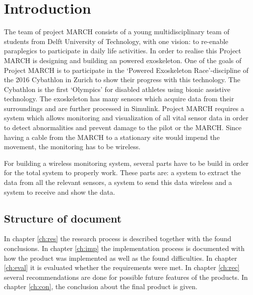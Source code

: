 \chapter{Introduction}
The team of project MARCH consists of a young multidisciplinary team of students from Delft University of Technology, with one vision: to re-enable paraplegics to participate in daily life activities. In order to realise this Project MARCH is designing and building an
powered exoskeleton. One of the goals of Project MARCH is to participate in the ‘Powered Exoskeleton Race’-discipline
of the 2016 Cybathlon in Zurich to show their progress with this technology. The Cybathlon is the first ‘Olympics’ for disabled athletes
using bionic assistive technology. 
The exoskeleton has many sensors which acquire data from their surroundings and are further processed in Simulink. Project MARCH requires a system which allows monitoring and visualization of all vital sensor data in order to detect abnormalities and prevent damage to the pilot or the MARCH. Since having a cable from the MARCH to a stationary site would impend the movement, the monitoring has to be wireless. 		

For building a wireless monitoring system, several parts have to be build in order for the total system to properly work. These parts are: a system to extract the data from all the relevant sensors, a system to send this data wireless and a system to receive and show the data.
\section{Structure of document}
In chapter \ref{ch:res} the research process is described together with the found conclusions. In chapter \ref{ch:imp} the implementation process is documented with how the product was implemented as well as the found difficulties. In chapter \ref{ch:eval} it is evaluated whether the requirements were met. In chapter \ref{ch:rec} several recommendations are done for possible future features of the products.  In chapter \ref{ch:con}, the conclusion about the final product is given.
